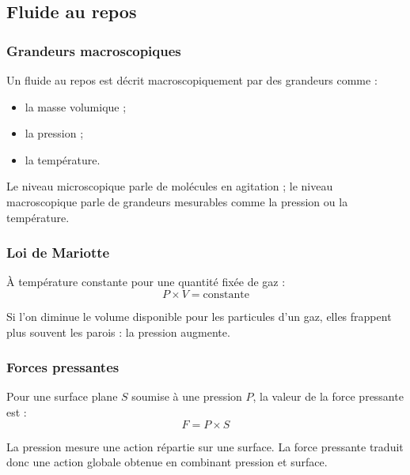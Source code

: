 \documentclass[11pt,a4paper]{article}
\begin{document}
\subsection{Fluide au repos}

\subsubsection{Grandeurs macroscopiques}

\begin{definitionbox}
Un fluide au repos est décrit macroscopiquement par des grandeurs comme :
\begin{itemize}
    \item la masse volumique ;
    \item la pression ;
    \item la température.
\end{itemize}
\end{definitionbox}

\begin{sensbox}
Le niveau microscopique parle de molécules en agitation ; le niveau macroscopique parle de grandeurs mesurables comme la pression ou la température.
\end{sensbox}

\subsubsection{Loi de Mariotte}

\begin{proprbox}
À température constante pour une quantité fixée de gaz :
\[
P\times V=\text{constante}
\]
\end{proprbox}

\begin{sensbox}
Si l'on diminue le volume disponible pour les particules d'un gaz, elles frappent plus souvent les parois : la pression augmente.
\end{sensbox}

\subsubsection{Forces pressantes}

\begin{proprbox}
Pour une surface plane \(S\) soumise à une pression \(P\), la valeur de la force pressante est :
\[
F=P\times S
\]
\end{proprbox}

\begin{sensbox}
La pression mesure une action répartie sur une surface.  
La force pressante traduit donc une action globale obtenue en combinant pression et surface.
\end{sensbox}
\end{document}
